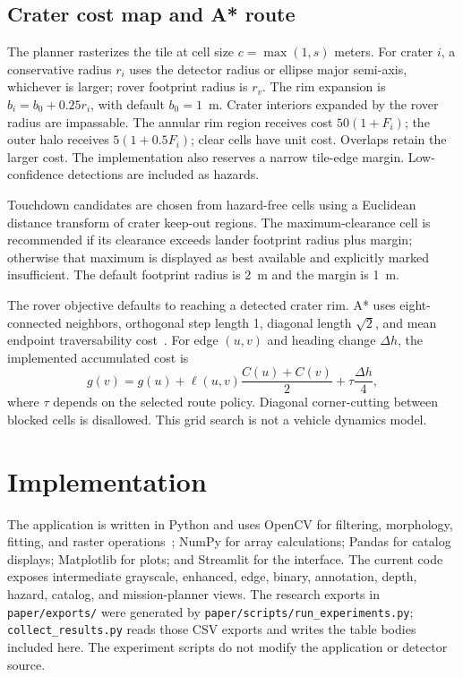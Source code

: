 \documentclass[conference]{IEEEtran}
\begin{document}
\subsection{Crater cost map and A* route}
The planner rasterizes the tile at cell size $c=\max(1,s)$ meters. For crater $i$, a conservative radius $r_i$ uses the detector radius or ellipse major semi-axis, whichever is larger; rover footprint radius is $r_v$. The rim expansion is $b_i=b_0+0.25r_i$, with default $b_0=1$~m. Crater interiors expanded by the rover radius are impassable. The annular rim region receives cost $50(1+F_i)$; the outer halo receives $5(1+0.5F_i)$; clear cells have unit cost. Overlaps retain the larger cost. The implementation also reserves a narrow tile-edge margin. Low-confidence detections are included as hazards.

Touchdown candidates are chosen from hazard-free cells using a Euclidean distance transform of crater keep-out regions. The maximum-clearance cell is recommended if its clearance exceeds lander footprint radius plus margin; otherwise that maximum is displayed as best available and explicitly marked insufficient. The default footprint radius is 2~m and the margin is 1~m.

The rover objective defaults to reaching a detected crater rim. A* uses eight-connected neighbors, orthogonal step length 1, diagonal length $\sqrt{2}$, and mean endpoint traversability cost~\cite{hart1968}. For edge $(u,v)$ and heading change $\Delta h$, the implemented accumulated cost is
\begin{equation}
g(v)=g(u)+\ell(u,v)\frac{C(u)+C(v)}{2}+\tau\frac{\Delta h}{4},
\label{eq:astar}
\end{equation}
where $\tau$ depends on the selected route policy. Diagonal corner-cutting between blocked cells is disallowed. This grid search is not a vehicle dynamics model.

\section{Implementation}
The application is written in Python and uses OpenCV for filtering, morphology, fitting, and raster operations~\cite{bradski2000}; NumPy for array calculations; Pandas for catalog displays; Matplotlib for plots; and Streamlit for the interface. The current code exposes intermediate grayscale, enhanced, edge, binary, annotation, depth, hazard, catalog, and mission-planner views. The research exports in \texttt{paper/exports/} were generated by \texttt{paper/scripts/run\_experiments.py}; \texttt{collect\_results.py} reads those CSV exports and writes the table bodies included here. The experiment scripts do not modify the application or detector source.
\end{document}
